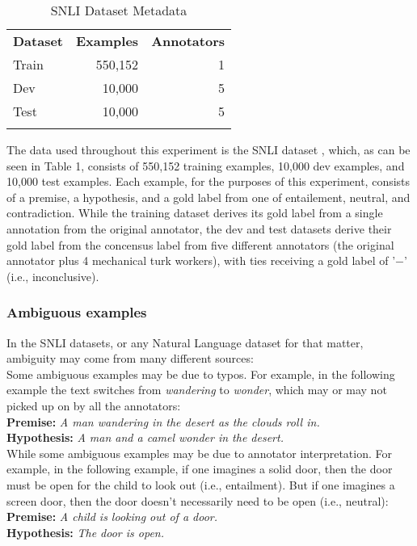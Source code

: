 \documentclass[11pt]{article}
\begin{document}
\begin{table}
  \begin{tabular}{|l|r|r|}
    \Xhline{.1pt}
    \textbf{Dataset} & \textbf{Examples} & \textbf{Annotators} \\
    \Xhline{.1pt}
    Train & 550,152 & 1\\
    \Xhline{.1pt}
    Dev & 10,000 & 5\\
    \Xhline{.1pt}
    Test & 10,000 & 5\\
    \Xhline{.1pt}
  \end{tabular}
  \caption{SNLI Dataset Metadata}
\end{table}

The data used throughout this experiment is the SNLI dataset \citep{snli:emnlp2015}, which, as can be seen in Table 1,
consists of 550,152 training examples, 10,000 dev examples, and 10,000 test examples. Each example, for the purposes
of this experiment, consists of a premise, a hypothesis, and a
gold label from one of entailement, neutral, and contradiction. While the training dataset derives its gold label
from a single annotation from the original annotator, the dev and test datasets derive their gold label from the
concensus label from five different annotators (the original annotator plus 4 mechanical turk workers), with
ties receiving a gold label of '$-$' (i.e., inconclusive).

\subsubsection{Ambiguous examples}

In the SNLI datasets, or any Natural Language dataset for that matter, ambiguity may come from many different sources:\\

Some ambiguous examples may be due to typos. For example, in the following example the text
switches from \textit{wandering} to \textit{wonder}, which may or may not picked up on by all
the annotators:\\
\textbf{Premise:} \textit{A man wandering in the desert as the clouds roll in.}\\
\textbf{Hypothesis:} \textit{A man and a camel wonder in the desert.}\\

While some ambiguous examples may be due to annotator interpretation. For example, in the
following example, if one imagines a solid door, then the door must be open for the child to look out (i.e., entailment).
But if one imagines a screen door, then the door doesn't necessarily need to be open (i.e., neutral):\\
\textbf{Premise:} \textit{A child is looking out of a door.}\\
\textbf{Hypothesis:} \textit{The door is open.}\\
\end{document}
